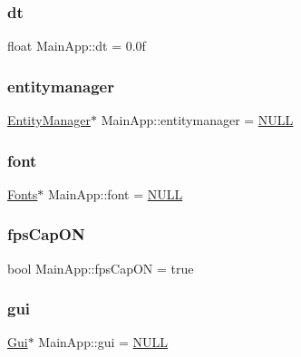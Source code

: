 \mbox{\label{class_main_app_a390db6b237e58249133985dd8849712a}} 
\subsubsection{\texorpdfstring{dt}{dt}}
{\footnotesize\ttfamily float Main\+App\+::dt = 0.\+0f}

\mbox{\label{class_main_app_a051ac578b8f1f72175aa120f14d0ef4f}} 
\subsubsection{\texorpdfstring{entitymanager}{entitymanager}}
{\footnotesize\ttfamily \mbox{\hyperlink{class_entity_manager}{Entity\+Manager}}$\ast$ Main\+App\+::entitymanager = \mbox{\hyperlink{_defs_8h_a070d2ce7b6bb7e5c05602aa8c308d0c4}{N\+U\+LL}}}

\mbox{\label{class_main_app_abda35a9609b299c1e5c4ba9abb5c8176}} 
\subsubsection{\texorpdfstring{font}{font}}
{\footnotesize\ttfamily \mbox{\hyperlink{class_fonts}{Fonts}}$\ast$ Main\+App\+::font = \mbox{\hyperlink{_defs_8h_a070d2ce7b6bb7e5c05602aa8c308d0c4}{N\+U\+LL}}}

\mbox{\label{class_main_app_a269905e95286cf7d61da42da263c4e6f}} 
\subsubsection{\texorpdfstring{fpsCapON}{fpsCapON}}
{\footnotesize\ttfamily bool Main\+App\+::fps\+Cap\+ON = true}

\mbox{\label{class_main_app_a982a4771701a0e6cffd05ffc456bbfeb}} 
\subsubsection{\texorpdfstring{gui}{gui}}
{\footnotesize\ttfamily \mbox{\hyperlink{class_gui}{Gui}}$\ast$ Main\+App\+::gui = \mbox{\hyperlink{_defs_8h_a070d2ce7b6bb7e5c05602aa8c308d0c4}{N\+U\+LL}}}


